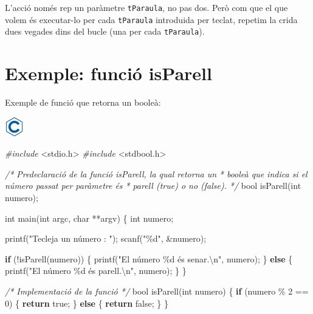 \documentclass[]{book}
\newenvironment{Shaded}{\begin{snugshade}}{\end{snugshade}}
\newcommand{\CommentTok}[1]{\textcolor[rgb]{0.56,0.35,0.01}{\textit{#1}}}
\newcommand{\ControlFlowTok}[1]{\textcolor[rgb]{0.13,0.29,0.53}{\textbf{#1}}}
\newcommand{\DataTypeTok}[1]{\textcolor[rgb]{0.13,0.29,0.53}{#1}}
\newcommand{\DecValTok}[1]{\textcolor[rgb]{0.00,0.00,0.81}{#1}}
\newcommand{\ImportTok}[1]{#1}
\newcommand{\NormalTok}[1]{#1}
\newcommand{\PreprocessorTok}[1]{\textcolor[rgb]{0.56,0.35,0.01}{\textit{#1}}}
\newcommand{\SpecialCharTok}[1]{\textcolor[rgb]{0.00,0.00,0.00}{#1}}
\newcommand{\StringTok}[1]{\textcolor[rgb]{0.31,0.60,0.02}{#1}}
\begin{document}
L'acció només rep un paràmetre \texttt{tParaula}, no pas dos. Però com que el que volem és executar-lo per cada \texttt{tParaula} introduida per teclat, repetim la crida dues vegades dins del bucle (una per cada \texttt{tParaula}).

\hypertarget{exemple-funcio-isparell}{%
\section{Exemple: funció isParell}\label{exemple-funcio-isparell}}

Exemple de funció que retorna un booleà:

\includegraphics{./img/c.png}

\begin{Shaded}
\begin{Highlighting}[]
\PreprocessorTok{\#include }\ImportTok{\textless{}stdio.h\textgreater{}}
\PreprocessorTok{\#include }\ImportTok{\textless{}stdbool.h\textgreater{}}

\CommentTok{/* Predeclaració de la funció isParell, la qual retorna un}
\CommentTok{ * booleà que indica si el número passat per paràmetre és}
\CommentTok{ * parell (true) o no (false). }
\CommentTok{ */}
\DataTypeTok{bool}\NormalTok{ isParell(}\DataTypeTok{int}\NormalTok{ numero);}

\DataTypeTok{int}\NormalTok{ main(}\DataTypeTok{int}\NormalTok{ argc, }\DataTypeTok{char}\NormalTok{ **argv) \{}
    \DataTypeTok{int}\NormalTok{ numero;}
    
\NormalTok{    printf(}\StringTok{"Tecleja un número : "}\NormalTok{);}
\NormalTok{    scanf(}\StringTok{"\%d"}\NormalTok{, \&numero);}

    \ControlFlowTok{if}\NormalTok{ (!isParell(numero)) \{}
\NormalTok{        printf(}\StringTok{"El número \%d és senar.}\SpecialCharTok{\textbackslash{}n}\StringTok{"}\NormalTok{, numero);}
\NormalTok{    \} }\ControlFlowTok{else}\NormalTok{ \{}
\NormalTok{        printf(}\StringTok{"El número \%d és parell.}\SpecialCharTok{\textbackslash{}n}\StringTok{"}\NormalTok{, numero);}
\NormalTok{    \}}
\NormalTok{\}}

\CommentTok{/* Implementació de la funció */}
\DataTypeTok{bool}\NormalTok{ isParell(}\DataTypeTok{int}\NormalTok{ numero) \{}
    \ControlFlowTok{if}\NormalTok{ (numero \% }\DecValTok{2}\NormalTok{ == }\DecValTok{0}\NormalTok{) \{}
        \ControlFlowTok{return}\NormalTok{ true;}
\NormalTok{    \} }\ControlFlowTok{else}\NormalTok{ \{}
        \ControlFlowTok{return}\NormalTok{ false;}
\NormalTok{    \}}
\NormalTok{\}}
\end{Highlighting}
\end{Shaded}
\end{document}
